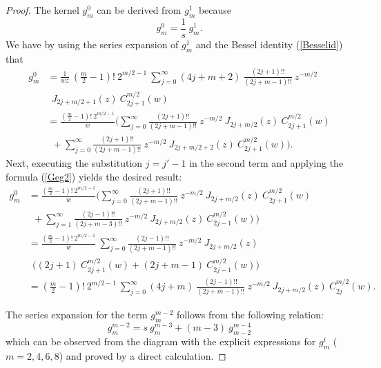 \documentclass{amsart}
\theoremstyle{remark}
\begin{document}
\begin{proof}
The kernel $g_m^0$ can be derived from $g_m^1$ because
\begin{displaymath}
g_m^0 = \frac{1}{s} \ g_m^1.
\end{displaymath}
We have by using the series expansion of $g_m^1$ and the Bessel identity (\ref{Besselid}) that 
\begin{align*}
g_m^0 &= \frac{1}{wz} \ \left( \frac{m}{2}-1 \right)! \ 2^{m/2-1} \ \sum_{j=0}^{\infty} (4j+m+2) \ \frac{(2j+1)!!}{(2j+m-1)!!} \ z^{-m/2} \\
& \ \  J_{2j+m/2+1}(z) \  C_{2j+1}^{m/2}(w)\\
&=  \frac{\left( \frac{m}{2}-1 \right)! \ 2^{m/2-1}}{w} \biggl( \sum_{j=0}^{\infty} \frac{(2j+1)!!}{(2j+m-1)!!} \ z^{-m/2} \ J_{2j+m/2}(z) \ C_{2j+1}^{m/2}(w)\\
& \ \  + \sum_{j=0}^{\infty} \frac{(2j+1)!!}{(2j+m-1)!!} \ z^{-m/2} \ J_{2j+m/2+2}(z) \ C_{2j+1}^{m/2}(w) \biggr) .
\end{align*}
Next, executing the substitution $j=j'-1$ in the second term and applying the formula (\ref{Geg2}) yields the desired result:
\begin{align*}
g_m^0 &=  \frac{\left( \frac{m}{2}-1 \right)! \ 2^{m/2-1}}{w} \biggl( \sum_{j=0}^{\infty} \frac{(2j+1)!!}{(2j+m-1)!!} \ z^{-m/2} \ J_{2j+m/2}(z) \ C_{2j+1}^{m/2}(w)\\
& \ \  + \sum_{j=1}^{\infty} \frac{(2j-1)!!}{(2j+m-3)!!} \ z^{-m/2} \ J_{2j+m/2}(z) \ C_{2j-1}^{m/2}(w) \biggr)\\
&=  \frac{\left( \frac{m}{2}-1 \right)! \ 2^{m/2-1}}{w} \ \sum_{j=0}^{\infty} \frac{(2j-1)!!}{(2j+m-1)!!} \ z^{-m/2} \ J_{2j+m/2}(z)\\
& \ \  \biggl( (2j+1) \  C_{2j+1}^{m/2}(w) +  (2j+m-1) \  C_{2j-1}^{m/2}(w) \biggr)\\
&=  \left( \frac{m}{2}-1 \right)! \ 2^{m/2-1} \ \sum_{j=0}^{\infty} (4j+m) \ \frac{(2j-1)!!}{(2j+m-1)!!} \ z^{-m/2} \ J_{2j+m/2}(z) \ C_{2j}^{m/2}(w) .
\end{align*}

The series expansion for the term $g_{m}^{m-2}$ follows from the following relation:
\begin{displaymath}
g_m^{m-2} = s \ g_m^{m-3} + (m-3) \ g_{m-2}^{m-4} 
\end{displaymath}
which can be observed from the diagram with the explicit expressions for $g_m^i$ ($m=2,4,6,8$) and proved by a direct calculation.


\end{proof}
\end{document}
